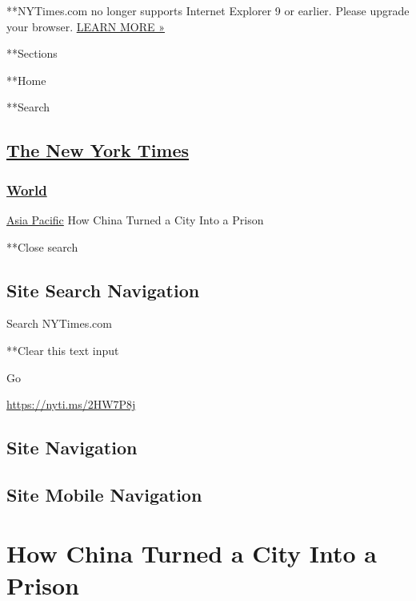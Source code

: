 **NYTimes.com no longer supports Internet Explorer 9 or earlier. Please
upgrade your browser.
\href{http://www.nytimes3xbfgragh.onion/content/help/site/ie9-support.html}{LEARN
MORE »}

**Sections

**Home

**Search

\hypertarget{the-new-york-times}{%
\subsection{\texorpdfstring{\href{http://www.nytimes3xbfgragh.onion/}{The
New York Times}}{The New York Times}}\label{the-new-york-times}}

\hypertarget{-world-}{%
\subsubsection{\texorpdfstring{ \href{/section/world}{World}
}{ World }}\label{-world-}}

\href{/section/world/asia}{Asia Pacific} \textbar{}How China Turned a
City Into a Prison

**Close search

\hypertarget{site-search-navigation}{%
\subsection{Site Search Navigation}\label{site-search-navigation}}

Search NYTimes.com

**Clear this text input

Go

\href{https://nyti.ms/2HW7P8j}{https://nyti.ms/2HW7P8j}

\hypertarget{site-navigation}{%
\subsection{Site Navigation}\label{site-navigation}}

\hypertarget{site-mobile-navigation}{%
\subsection{Site Mobile Navigation}\label{site-mobile-navigation}}

\hypertarget{how-china-turned-a-city-into-a-prison}{%
\section{How China Turned a City Into a
Prison}\label{how-china-turned-a-city-into-a-prison}}

